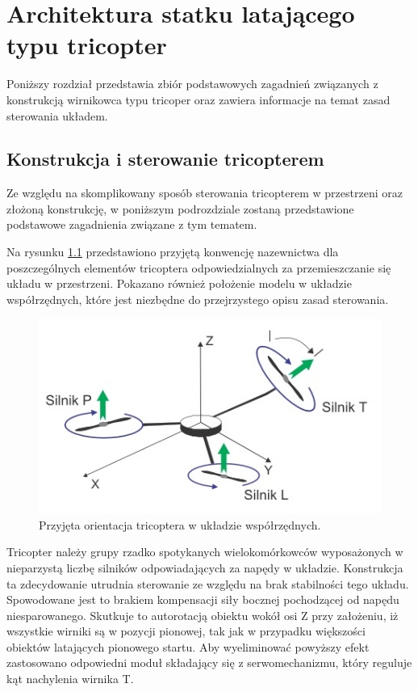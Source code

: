 \chapter{Architektura statku latającego typu tricopter}
\label{cha:architektura_statku_latajacego_typu_tricopter}

Poniższy rozdział przedstawia zbiór podstawowych zagadnień związanych z konstrukcją wirnikowca typu tricoper oraz zawiera informacje na temat zasad sterowania układem.

\section{Konstrukcja i sterowanie tricopterem}

Ze względu na skomplikowany sposób sterowania tricopterem w przestrzeni oraz złożoną konstrukcję, w poniższym podrozdziale zostaną przedstawione podstawowe zagadnienia związane z tym tematem.

Na rysunku \ref{fig:orientation} przedstawiono przyjętą konwencję nazewnictwa dla poszczególnych elementów tricoptera odpowiedzialnych za przemieszczanie się układu w przestrzeni. Pokazano również położenie modelu w układzie współrzędnych, które jest niezbędne do przejrzystego opisu zasad sterowania.

\begin{figure}[!htbp]
\centering
\includegraphics[width=0.7\linewidth]{./include/orientation}
\caption{Przyjęta orientacja tricoptera w układzie współrzędnych.}
\label{fig:orientation}
\end{figure}

Tricopter należy grupy rzadko spotykanych wielokomórkowców wyposażonych w nieparzystą liczbę silników odpowiadających za napędy w układzie.
Konstrukcja ta zdecydowanie utrudnia sterowanie ze względu na brak stabilności tego układu. Spowodowane jest to brakiem kompensacji siły bocznej pochodzącej od napędu niesparowanego. Skutkuje to autorotacją obiektu wokół osi Z przy założeniu, iż wszystkie wirniki są w pozycji pionowej, tak jak w przypadku większości obiektów latających pionowego startu. Aby wyeliminować powyższy efekt zastosowano odpowiedni moduł składający się z serwomechanizmu, który reguluje kąt nachylenia wirnika T.


